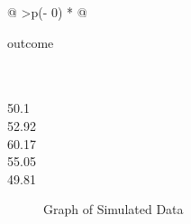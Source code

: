 \documentclass[
  letterpaper,
  DIV=11,
  numbers=noendperiod]{scrreprt}
\begin{document}
\begin{longtable}[]{@{}
  >{\centering\arraybackslash}p{(\columnwidth - 0\tabcolsep) * }@{}}

\caption{\label{tbl-simulateddata}Simulated Multilevel Data}

\tabularnewline

\toprule\noalign{}
\begin{minipage}[b]{\linewidth}\centering
outcome
\end{minipage} \\
\midrule\noalign{}
\endhead
\bottomrule\noalign{}
 \\
50.1 \\
52.92 \\
60.17 \\
55.05 \\
49.81 \\

\end{longtable}

\begin{figure}


\caption{\label{fig-data}Graph of Simulated Data}

\end{figure}%
\end{document}

